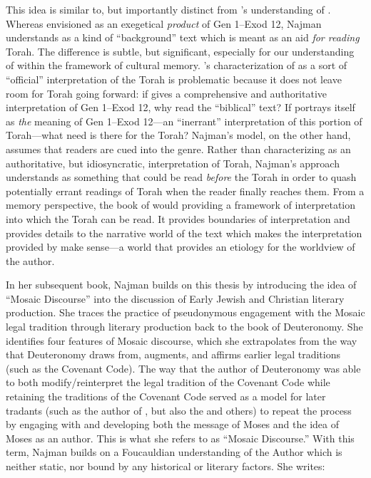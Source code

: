 This idea is similar to, but importantly distinct from \vanderkam's understanding of \jub. Whereas \vanderkam envisioned \jub as an exegetical \emph{product} of Gen 1--Exod 12, Najman understands \jub as a kind of ``background'' text which is meant as an aid \emph{for reading} Torah. The difference is subtle, but significant, especially for our understanding of \jub within the framework of cultural memory. \vanderkam's characterization of \jub as a sort of ``official'' interpretation of the Torah is problematic because it does not leave room for Torah going forward: if \jub gives a comprehensive and authoritative interpretation of Gen 1--Exod 12, why read the ``biblical'' text? If \jub portrays itself as \emph{the} meaning of Gen 1--Exod 12---an ``inerrant'' interpretation of this portion of Torah---what need is there for the Torah? Najman's model, on the other hand, assumes that readers are cued into the genre. Rather than  characterizing \jub as an authoritative, but idiosyncratic, interpretation of Torah, Najman's approach understands \jub as something that could be read \emph{before} the Torah in order to quash potentially errant readings of Torah when the reader finally reaches them.%
    \autocite[408]{najman_jsj1999} 
From a memory perspective, the book of \jub would providing a framework of interpretation into which the Torah can be read. It provides boundaries of interpretation and provides details to the narrative world of the text which makes the interpretation provided by \jub make sense---a world that provides an etiology for the worldview of the author. 

In her subsequent book, Najman builds on this thesis by introducing the idea of ``Mosaic Discourse'' into the discussion of Early Jewish and Christian literary production. She traces the practice of pseudonymous engagement with the Mosaic legal tradition through literary production back to the book of Deuteronomy.\autocite[48]{najman2003} She identifies four features of Mosaic discourse, which she extrapolates from the way that Deuteronomy draws from, augments, and affirms earlier legal traditions (such as the Covenant Code). The way that the author of Deuteronomy was able to both modify/reinterpret the legal tradition of the Covenant Code while retaining the traditions of the Covenant Code served as a model for later tradants (such as the author of \jub, but also the \templescroll and others) to repeat the process by engaging with and developing both the message of Moses and the idea of Moses as an author. This is what she refers to as ``Mosaic Discourse.'' With this term, Najman builds on a Foucauldian understanding of the Author which is neither static, nor bound by any historical or literary factors. She writes:

